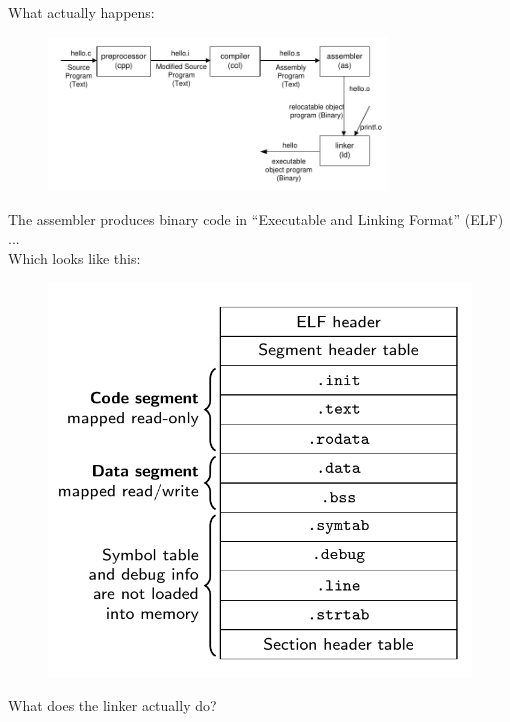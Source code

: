 \documentclass[10pt]{beamer}
\begin{document}
\begin{frame}{}
    What actually happens:
    \begin{figure}
        \includegraphics[keepaspectratio, width=0.8\textwidth, height=\textheight-2\baselineskip-2\baselineskip]{img/compile.png} \\
    \end{figure}
    The assembler produces binary code in ``Executable and Linking Format'' (ELF) ... \\
    \framebreak
    Which looks like this:
    \begin{figure}
        \includegraphics[keepaspectratio, width=\textwidth, height=\textheight-2\baselineskip-2\baselineskip]{img/elf.png} \\
    \end{figure}
    \framebreak
    
     What does the linker actually do? \\
     

\end{frame}
\end{document}
